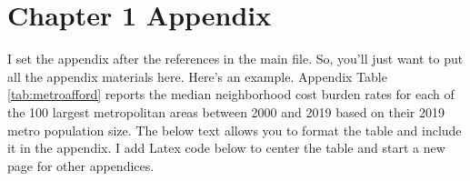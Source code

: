 \documentclass[
]{DissertateCUNY}
\begin{document}
\hypertarget{chapter-1-appendix}{%
\section*{Chapter 1 Appendix}\label{chapter-1-appendix}}

I set the appendix after the references in the main file. So, you'll
just want to put all the appendix materials here. Here's an example.
Appendix Table \ref{tab:metroafford} reports the median neighborhood
cost burden rates for each of the 100 largest metropolitan areas between
2000 and 2019 based on their 2019 metro population size. The below text
allows you to format the table and include it in the appendix. I add
Latex code below to center the table and start a new page for other
appendices.
\end{document}
